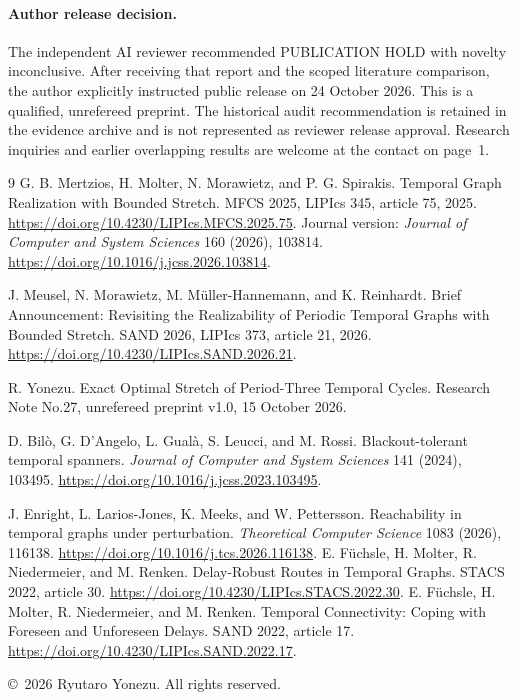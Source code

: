 \documentclass[11pt,a4paper]{article}
\begin{document}
\paragraph{Author release decision.}
The independent AI reviewer recommended PUBLICATION HOLD with novelty inconclusive. After receiving that report and the scoped literature comparison, the author explicitly instructed public release on 24 October 2026. This is a qualified, unrefereed preprint. The historical audit recommendation is retained in the evidence archive and is not represented as reviewer release approval. Research inquiries and earlier overlapping results are welcome at the contact on page~1.

\begin{thebibliography}{9}
G. B. Mertzios, H. Molter, N. Morawietz, and P. G. Spirakis.
\newblock Temporal Graph Realization with Bounded Stretch.
\newblock MFCS 2025, LIPIcs 345, article 75, 2025.
\newblock \url{https://doi.org/10.4230/LIPIcs.MFCS.2025.75}.
\newblock Journal version: \emph{Journal of Computer and System Sciences} 160 (2026), 103814.
\url{https://doi.org/10.1016/j.jcss.2026.103814}.

J. Meusel, N. Morawietz, M. M\"uller-Hannemann, and K. Reinhardt.
\newblock Brief Announcement: Revisiting the Realizability of Periodic Temporal Graphs with Bounded Stretch.
\newblock SAND 2026, LIPIcs 373, article 21, 2026.
\newblock \url{https://doi.org/10.4230/LIPIcs.SAND.2026.21}.

R. Yonezu.
\newblock Exact Optimal Stretch of Period-Three Temporal Cycles.
\newblock Research Note No.27, unrefereed preprint v1.0, 15 October 2026.

D. Bil\`o, G. D'Angelo, L. Gual\`a, S. Leucci, and M. Rossi.
\newblock Blackout-tolerant temporal spanners.
\newblock \emph{Journal of Computer and System Sciences} 141 (2024), 103495.
\newblock \url{https://doi.org/10.1016/j.jcss.2023.103495}.

J. Enright, L. Larios-Jones, K. Meeks, and W. Pettersson.
\newblock Reachability in temporal graphs under perturbation.
\newblock \emph{Theoretical Computer Science} 1083 (2026), 116138.
\newblock \url{https://doi.org/10.1016/j.tcs.2026.116138}.
E. F\"uchsle, H. Molter, R. Niedermeier, and M. Renken.
\newblock Delay-Robust Routes in Temporal Graphs. STACS 2022, article 30.
\newblock \url{https://doi.org/10.4230/LIPIcs.STACS.2022.30}.
E. F\"uchsle, H. Molter, R. Niedermeier, and M. Renken.
\newblock Temporal Connectivity: Coping with Foreseen and Unforeseen Delays.
\newblock SAND 2022, article 17.
\newblock \url{https://doi.org/10.4230/LIPIcs.SAND.2022.17}.

\end{thebibliography}
\vspace{5pt}
\noindent\footnotesize\copyright\ 2026 Ryutaro Yonezu. All rights reserved.\normalsize
\end{document}
